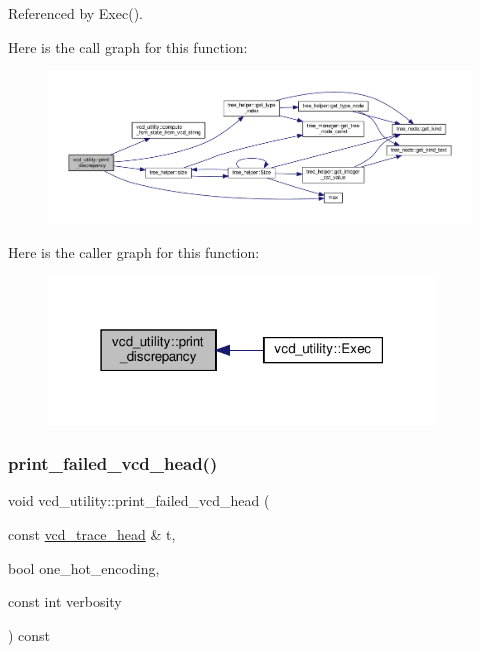 Referenced by Exec().

Here is the call graph for this function\+:
\nopagebreak
\begin{figure}[H]
\begin{center}
\leavevmode
\includegraphics[width=350pt]{d8/d51/classvcd__utility_a4f2a5d8b68fe639e2d1eeb4f4c4c429a_cgraph}
\end{center}
\end{figure}
Here is the caller graph for this function\+:
\nopagebreak
\begin{figure}[H]
\begin{center}
\leavevmode
\includegraphics[width=291pt]{d8/d51/classvcd__utility_a4f2a5d8b68fe639e2d1eeb4f4c4c429a_icgraph}
\end{center}
\end{figure}
\mbox{\label{classvcd__utility_a9ff21c0bde72b02cd81bd7443eba6353}} 
\subsubsection{\texorpdfstring{print\+\_\+failed\+\_\+vcd\+\_\+head()}{print\_failed\_vcd\_head()}}
{\footnotesize\ttfamily void vcd\+\_\+utility\+::print\+\_\+failed\+\_\+vcd\+\_\+head (\begin{DoxyParamCaption}\item[{const \hyperlink{structvcd__trace__head}{vcd\+\_\+trace\+\_\+head} \&}]{t,  }\item[{bool}]{one\+\_\+hot\+\_\+encoding,  }\item[{const int}]{verbosity }\end{DoxyParamCaption}) const\hspace{0.3cm}{\ttfamily [protected]}}




